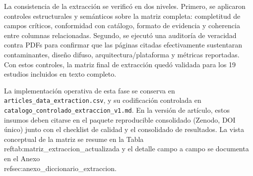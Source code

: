 La consistencia de la extracción se verificó en dos niveles. Primero, se aplicaron controles estructurales y semánticos sobre la matriz completa: completitud de campos críticos, conformidad con catálogo, formato de evidencia y coherencia entre columnas relacionadas. Segundo, se ejecutó una auditoría de veracidad contra PDFs para confirmar que las páginas citadas efectivamente sustentaran contaminantes, diseño difuso, arquitectura/plataforma y métricas reportadas. Con estos controles, la matriz final de extracción quedó validada para los 19 estudios incluidos en texto completo.

La implementación operativa de esta fase se conserva en \texttt{articles\_data\_extraction.csv}, y su codificación controlada en \texttt{catalogo\_controlado\_extraccion\_v1.md}. En la versión de artículo, estos insumos deben citarse en el paquete reproducible consolidado (Zenodo, DOI único) junto con el checklist de calidad y el consolidado de resultados. La vista conceptual de la matriz se resume en la Tabla~\\ref{tab:matriz_extraccion_actualizada} y el detalle campo a campo se documenta en el Anexo~\\ref{sec:anexo_diccionario_extraccion}.

